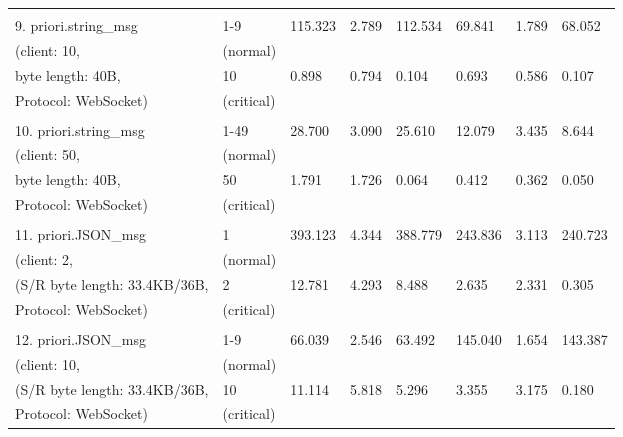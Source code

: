 \begin{table}[htbp]
\begin{tabular}{m{} m{} m{} m{} m{} m{} m{} m{}}
        & & & & & & &\\
        9. priori.string\_msg         & 1-9        & 115.323 & 2.789  & 112.534 & 69.841  & 1.789  & 68.052  \\
        (client: 10,                  & (normal)   &         &        &         &         &        &         \\
        byte length: 40B,             & 10         & 0.898   & 0.794  & 0.104   & 0.693   & 0.586  & 0.107   \\
        Protocol: WebSocket)          & (critical) &         &        &         &         &        &         \\
        & & & & & & &\\
        10. priori.string\_msg        & 1-49       & 28.700  & 3.090  & 25.610  & 12.079  & 3.435  & 8.644   \\
        (client: 50,                  & (normal)   &         &        &         &         &        &         \\
        byte length: 40B,             & 50         & 1.791   & 1.726  & 0.064   & 0.412   & 0.362  & 0.050   \\
        Protocol: WebSocket)          & (critical) &         &        &         &         &        &         \\
        & & & & & & &\\
        11. priori.JSON\_msg          & 1          & 393.123 & 4.344  & 388.779 & 243.836 & 3.113  & 240.723 \\
        (client: 2,                   & (normal)   &         &        &         &         &        &         \\
        (S/R byte length: 33.4KB/36B, & 2          & 12.781  & 4.293  & 8.488   & 2.635   & 2.331  & 0.305   \\
        Protocol: WebSocket)          & (critical) &         &        &         &         &        &         \\
        & & & & & & &\\
        12. priori.JSON\_msg          & 1-9        & 66.039  & 2.546  & 63.492  & 145.040 & 1.654  & 143.387 \\
        (client: 10,                  & (normal)   &         &        &         &         &        &         \\
        (S/R byte length: 33.4KB/36B, & 10         & 11.114  & 5.818  & 5.296   & 3.355   & 3.175  & 0.180   \\
        Protocol: WebSocket)          & (critical) &         &        &         &         &        &         \\

\end{tabular}
\end{table}

